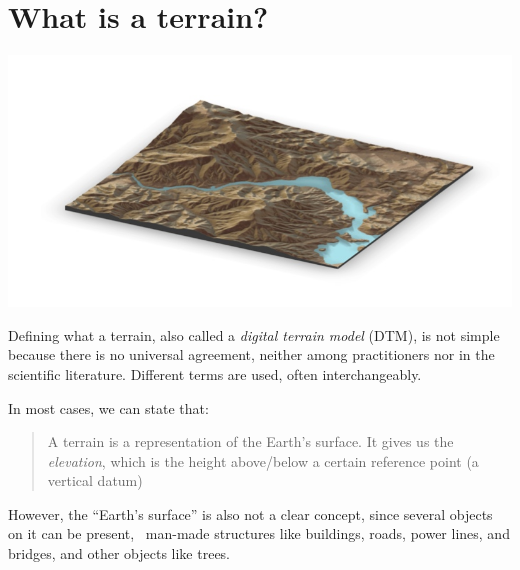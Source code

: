 
\graphicspath{{whatisterrain/}}



\chapter{What is a terrain?}%
\label{chap:whatisterrain}


\begin{center}
  \includegraphics[width=0.95\linewidth]{figs/header.jpg}
\end{center}

Defining what a terrain, also called a \emph{digital terrain model} (DTM), is not simple because there is no universal agreement, neither among practitioners nor in the scientific literature.
Different terms are used, often interchangeably.

In most cases, we can state that:

\begin{quote}
A terrain is a representation of the Earth's surface. 
It gives us the \emph{elevation}, which is the height above/below a certain reference point (a vertical datum)
\end{quote}

However, the ``Earth's surface'' is also not a clear concept, since several objects on it can be present, \eg\ man-made structures like buildings, roads, power lines, and bridges, and other objects like trees.

